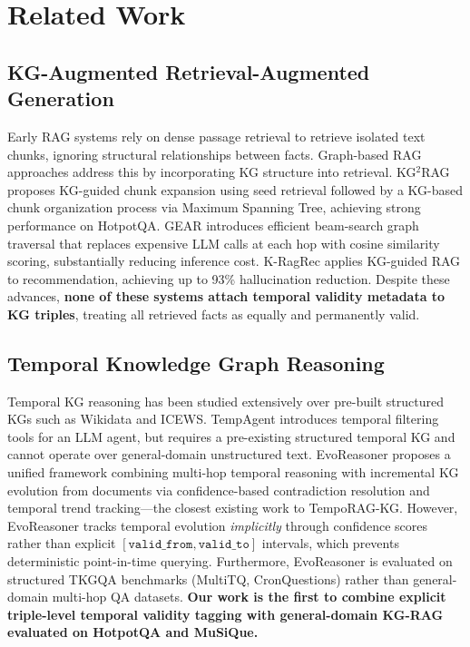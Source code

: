 \documentclass[11pt]{article}
\begin{document}
\section{Related Work}

\subsection{KG-Augmented Retrieval-Augmented Generation}

Early RAG systems \cite{lewis2020retrieval} rely on dense passage retrieval
to retrieve isolated text chunks, ignoring structural relationships between
facts. Graph-based RAG approaches address this by incorporating KG structure
into retrieval. KG$^2$RAG \cite{zhu2025kg2rag} proposes KG-guided chunk
expansion using seed retrieval followed by a KG-based chunk organization
process via Maximum Spanning Tree, achieving strong performance on
HotpotQA. GEAR \cite{ma2025gear} introduces efficient beam-search graph
traversal that replaces expensive LLM calls at each hop with cosine
similarity scoring, substantially reducing inference cost. K-RagRec
\cite{wang2025kragrec} applies KG-guided RAG to recommendation, achieving
up to 93\% hallucination reduction. Despite these advances,
\textbf{none of these systems attach temporal validity metadata to KG
triples}, treating all retrieved facts as equally and permanently valid.

\subsection{Temporal Knowledge Graph Reasoning}

Temporal KG reasoning has been studied extensively over pre-built structured
KGs such as Wikidata and ICEWS. TempAgent \cite{tempagent2025} introduces
temporal filtering tools for an LLM agent, but requires a pre-existing
structured temporal KG and cannot operate over general-domain unstructured
text. EvoReasoner \cite{evoreasonerevokg2025} proposes a unified framework
combining multi-hop temporal reasoning with incremental KG evolution from
documents via confidence-based contradiction resolution and temporal trend
tracking---the closest existing work to TempoRAG-KG. However, EvoReasoner
tracks temporal evolution \textit{implicitly} through confidence scores
rather than explicit $[\mathtt{valid\_from}, \mathtt{valid\_to}]$ intervals,
which prevents deterministic point-in-time querying. Furthermore,
EvoReasoner is evaluated on structured TKGQA benchmarks (MultiTQ,
CronQuestions) rather than general-domain multi-hop QA datasets.
\textbf{Our work is the first to combine explicit triple-level temporal
validity tagging with general-domain KG-RAG evaluated on HotpotQA and
MuSiQue.}
\end{document}
